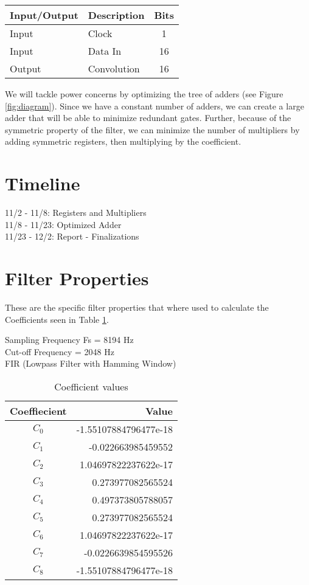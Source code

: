 \documentclass[12pt]{article}
\begin{document}
\begin{table}[ht]
\centering
\begin{tabular}{l | l | c}
\hline
Input/Output & Description & Bits \\
\hline \hline
Input & Clock & 1 \\
Input & Data In & 16 \\
Output & Convolution & 16 \\
\end{tabular}
\end{table}

We will tackle power concerns by optimizing the tree of adders (see Figure \ref{fig:diagram}).  Since we have a constant number of adders, we can create a large adder that will be able to minimize redundant gates.  Further, because of the symmetric property of the filter, we can minimize the number of multipliers by adding symmetric registers, then multiplying by the coefficient.  

\section{Timeline}

11/2 - 11/8: Registers and Multipliers \\
11/8 - 11/23: Optimized Adder \\
11/23 - 12/2: Report - Finalizations \\

\section{Filter Properties}
These are the specific filter properties that where used to calculate the Coefficients seen in Table \ref{tab:coefficients}.

Sampling Frequency Fs = 8194 Hz \\
Cut-off Frequency = 2048 Hz \\
FIR (Lowpass Filter with Hamming Window) \\

\begin{table}[ht]
\centering
\begin{tabular}{ c | r }
\hline
Coeffiecient & Value \\
\hline \hline
$C_0$ & -1.55107884796477e-18 \\
$C_1$ & -0.022663985459552 \\
$C_2$ & 1.04697822237622e-17 \\
$C_3$ & 0.273977082565524 \\
$C_4$ & 0.497373805788057 \\
$C_5$ & 0.273977082565524 \\
$C_6$ & 1.04697822237622e-17 \\
$C_7$ & -0.0226639854595526 \\
$C_8$ & -1.55107884796477e-18 \\
\end{tabular}
\caption{Coefficient values}
\label{tab:coefficients}
\end{table}
\end{document}
